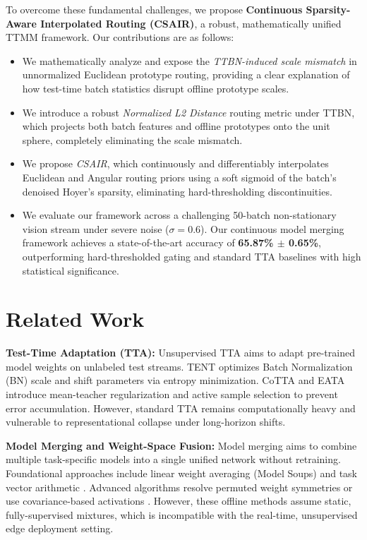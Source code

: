 \documentclass{article}
\theoremstyle{plain}
\theoremstyle{definition}
\theoremstyle{remark}
\begin{document}
To overcome these fundamental challenges, we propose \textbf{Continuous Sparsity-Aware Interpolated Routing (CSAIR)}, a robust, mathematically unified TTMM framework. Our contributions are as follows:
\begin{itemize}
    \item We mathematically analyze and expose the \emph{TTBN-induced scale mismatch} in unnormalized Euclidean prototype routing, providing a clear explanation of how test-time batch statistics disrupt offline prototype scales.
    \item We introduce a robust \emph{Normalized L2 Distance} routing metric under TTBN, which projects both batch features and offline prototypes onto the unit sphere, completely eliminating the scale mismatch.
    \item We propose \emph{CSAIR}, which continuously and differentiably interpolates Euclidean and Angular routing priors using a soft sigmoid of the batch's denoised Hoyer's sparsity, eliminating hard-thresholding discontinuities.
    \item We evaluate our framework across a challenging 50-batch non-stationary vision stream under severe noise ($\sigma=0.6$). Our continuous model merging framework achieves a state-of-the-art accuracy of \textbf{65.87\% $\pm$ 0.65\%}, outperforming hard-thresholded gating and standard TTA baselines with high statistical significance.
\end{itemize}

\section{Related Work}
\label{sec:related}

\textbf{Test-Time Adaptation (TTA):} Unsupervised TTA aims to adapt pre-trained model weights on unlabeled test streams. TENT \cite{wang2021tent} optimizes Batch Normalization (BN) scale and shift parameters via entropy minimization. CoTTA \cite{wang2022continual} and EATA \cite{niu2022efficient} introduce mean-teacher regularization and active sample selection to prevent error accumulation. However, standard TTA remains computationally heavy and vulnerable to representational collapse under long-horizon shifts.

\textbf{Model Merging and Weight-Space Fusion:} Model merging aims to combine multiple task-specific models into a single unified network without retraining. Foundational approaches include linear weight averaging (Model Soups) \cite{wortsman2022model} and task vector arithmetic \cite{ilharco2022editing,cheng2025whoever}. Advanced algorithms resolve permuted weight symmetries \cite{ainsworth2022git} or use covariance-based activations \cite{stoica2023zipit}. However, these offline methods assume static, fully-supervised mixtures, which is incompatible with the real-time, unsupervised edge deployment setting.
\end{document}

